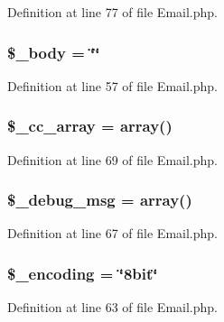 Definition at line 77 of file Email.\-php.

\subsubsection[{\$\-\_\-body}]{\setlength{\rightskip}{0pt plus 5cm}\$\-\_\-body = \char`\"{}\char`\"{}}\label{class_c_i___email_a2428d6733045fa7c07e5f61c8c85b8c9}


Definition at line 57 of file Email.\-php.

\subsubsection[{\$\-\_\-cc\-\_\-array}]{\setlength{\rightskip}{0pt plus 5cm}\$\-\_\-cc\-\_\-array = array()}\label{class_c_i___email_af979b4b8dc11cd847482938c13fd527d}


Definition at line 69 of file Email.\-php.

\subsubsection[{\$\-\_\-debug\-\_\-msg}]{\setlength{\rightskip}{0pt plus 5cm}\$\-\_\-debug\-\_\-msg = array()}\label{class_c_i___email_a23c65b604c773811f76e75093fe9a77b}


Definition at line 67 of file Email.\-php.

\subsubsection[{\$\-\_\-encoding}]{\setlength{\rightskip}{0pt plus 5cm}\$\-\_\-encoding = \char`\"{}8bit\char`\"{}}\label{class_c_i___email_a37d569dfb47810a72ca1cfc5095ad149}


Definition at line 63 of file Email.\-php.

